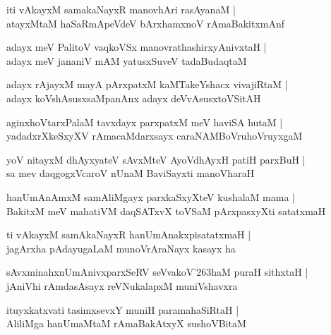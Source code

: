 \documentclass[twoside,12pt,openright]{book}
\def\S{\char'263}
\newcounter{shloka}[chapter]
\begin{document}
\begin{shloka}%
iti vAkayxM samakaNayxR manovhAri rasAyanaM |\\
atayxMtaM haSaRmApeVdeV bArxhamxnoV rAmaBakitxmAnf 
\end{shloka}

\begin{shloka}%
adayx meV PalitoV vaqkoVSx manovrathashirxyAnivxtaH |\\
adayx meV jananiV mAM yatusxSuveV tadaBudaqtaM 
\end{shloka}

\begin{shloka}%
adayx rAjayxM mayA pArxpatxM kaMTakeYshacx vivajiRtaM |\\
adayx koVshAsusxsaMpanAnx adayx deVvAsusxtoVSitAH
\end{shloka}

\begin{shloka}%
aginxhoVtarxPalaM tavxdayx parxpatxM meV haviSA hutaM |\\
yadadxrXkeSxyXV rAmacaMdarxsayx caraNAMBoVruhoVruyxgaM 
\end{shloka}

\begin{shloka}%
yoV nitayxM dhAyxyateV sAvxMteV AyoVdhAyxH patiH parxBuH |\\
sa mev daqgogxVcaroV nUnaM BaviSayxti manoVharaH 
\end{shloka}

\begin{shloka}%
hanUmAnAmxM samAliMgayx parxkaSxyXteV kushalaM mama |\\
BakitxM meV mahatiVM daqSATxvX toVSaM pArxpasxyXti satatxmaH 
\end{shloka}

\begin{shloka}%
ti vAkayxM samAkaNayxR hanUmAnakxpisatatxmaH |\\
jagArxha pAdayugaLaM munoVrAraNayx kasayx ha 
\end{shloka}

\begin{shloka}%
sAvxminahxnUmAnivxparxSeRV seVvakoV\S haM puraH sithxtaH |\\
jAniVhi rAmdasAsayx reVNukalapxM muniVshavxra
\end{shloka}

\begin{shloka}%
ituyxkatxvati tasimxsevxY muniH paramahaSiRtaH |\\
AliliMga hanUmaMtaM rAmaBakAtxyX sushoVBitaM 
\end{shloka}
\end{document}
